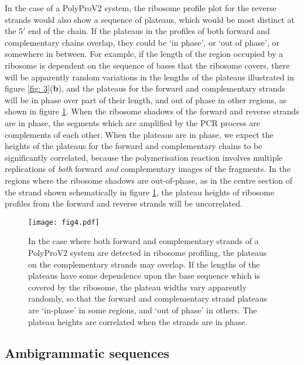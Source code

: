 \documentclass[12pt]{iopart}
\begin{document}
In the case of a PolyProV2 system, the ribosome profile plot for the reverse strands would also 
show a sequence of plateaus, which would be most distinct at the $5'$ end of the chain. 
If the plateaus in the profiles of both forward and complementary chains overlap, 
they could be \lq in phase', or \lq out of phase', or somewhere in between. 
For example, if the length of the region occupied by a ribosome is dependent on 
the sequence of bases that the ribosome covers, there will be apparently random 
variations in the lengths of the plateaus illustrated in figure \ref{fig: 3}({\bf b}), and 
the plateaus for the forward and complementary strands will be in phase over part of their length, 
and out of phase in other regions, as shown in figure \ref{fig: 4}. 
When the ribosome shadows of the forward and reverse strands 
are in phase, the segments which are amplified by the PCR process are complements of each other. 
When the plateaus are in phase, we expect the 
heights of the plateaus for the forward and complementary chains to be significantly 
correlated, because the polymerisation reaction involves multiple 
replications of \emph{both} forward \emph{and} complementary 
images of the fragments. In the regions where the ribosome shadows are 
out-of-phase, as in the centre section of the strand shown schematically in figure \ref{fig: 4}, the plateau heights of 
ribosome profiles from the forward and reverse strands will be uncorrelated.

\begin{figure}
\begin{center}
\texttt{[image: fig4.pdf]}
\caption{\label{fig: 4}
In the case where both forward and complementary strands of a PolyProV2 system are detected 
in ribosome profiling, the plateaus on the complementary strands may overlap. If the lengths of 
the plateaus have some dependence upon the base sequence which is covered by the ribosome, 
the plateau widths vary apparently randomly, so that the forward and complementary strand plateaus 
are \lq in-phase' in some regions, and \lq out of phase' in others. The plateau heights are 
correlated when the strands are in phase.
}
\end{center}
\end{figure}

 \subsection{Ambigrammatic sequences}
 \label{sec: 3.2}
 
\end{document}

